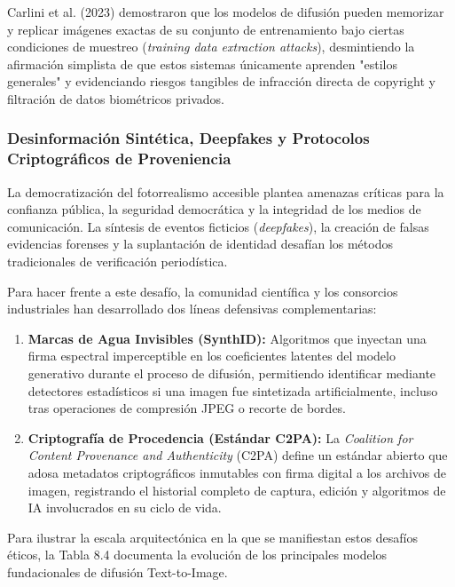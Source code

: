 Carlini et al. (2023) demostraron que los modelos de difusión pueden memorizar y replicar imágenes exactas de su conjunto de entrenamiento bajo ciertas condiciones de muestreo (\textit{training data extraction attacks}), desmintiendo la afirmación simplista de que estos sistemas únicamente aprenden "estilos generales" y evidenciando riesgos tangibles de infracción directa de copyright y filtración de datos biométricos privados.

\subsubsection{Desinformación Sintética, Deepfakes y Protocolos Criptográficos de Proveniencia}

La democratización del fotorrealismo accesible plantea amenazas críticas para la confianza pública, la seguridad democrática y la integridad de los medios de comunicación. La síntesis de eventos ficticios (\textit{deepfakes}), la creación de falsas evidencias forenses y la suplantación de identidad desafían los métodos tradicionales de verificación periodística.

Para hacer frente a este desafío, la comunidad científica y los consorcios industriales han desarrollado dos líneas defensivas complementarias:
\begin{enumerate}
    \item \textbf{Marcas de Agua Invisibles (SynthID):} Algoritmos que inyectan una firma espectral imperceptible en los coeficientes latentes del modelo generativo durante el proceso de difusión, permitiendo identificar mediante detectores estadísticos si una imagen fue sintetizada artificialmente, incluso tras operaciones de compresión JPEG o recorte de bordes.
    \item \textbf{Criptografía de Procedencia (Estándar C2PA):} La \textit{Coalition for Content Provenance and Authenticity} (C2PA) define un estándar abierto que adosa metadatos criptográficos inmutables con firma digital a los archivos de imagen, registrando el historial completo de captura, edición y algoritmos de IA involucrados en su ciclo de vida.
\end{enumerate}

Para ilustrar la escala arquitectónica en la que se manifiestan estos desafíos éticos, la Tabla 8.4 documenta la evolución de los principales modelos fundacionales de difusión Text-to-Image.

